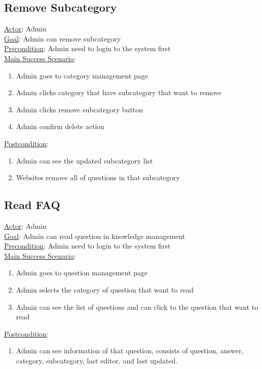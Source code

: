 \documentclass[12pt,oneside,openright,a4paper]{cpe-english-project}
\begin{document}
\subsection{Remove Subcategory}
\underline{Actor}: Admin\\
\underline{Goal}: Admin can remove subcategory\\
\underline{Precondition}: Admin need to login to the system first\\
\underline{Main Success Scenario}:
\begin{enumerate}[label={\arabic*.}]
	\item Admin goes to category management page
	\item Admin clicks category that have subcategory that want to remove
	\item Admin clicks remove subcategory button
	\item Admin confirm delete action
\end{enumerate}
\underline{Postcondition}: 
\begin{enumerate}[label={\arabic*.}]
	\item Admin can see the updated subcategory list
	\item Websites remove all of questions in that subcategory
\end{enumerate}

\subsection{Read FAQ}
\underline{Actor}: Admin\\
\underline{Goal}: Admin can read question in knowledge management\\
\underline{Precondition}: Admin need to login to the system first\\
\underline{Main Success Scenario}:
\begin{enumerate}[label={\arabic*.}]
	\item Admin goes to question management page
	\item Admin selects the category of question that want to read
	\item Admin can see the list of questions and can click to the question that want to read
\end{enumerate}
\underline{Postcondition}: 
\begin{enumerate}[label={\arabic*.}]
	\item Admin can see information of that question, consists of question, answer, category, subcategory, last editor, and last updated.
\end{enumerate}
\end{document}
